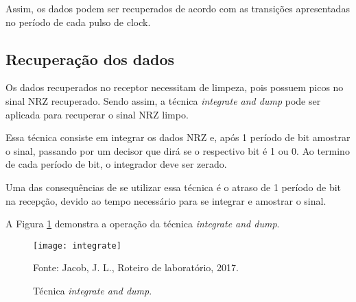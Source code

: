 	Assim, os dados podem ser recuperados de acordo com as transições apresentadas no período de cada pulso de clock.
	
\subsection{Recuperação dos dados}

	Os dados recuperados no receptor necessitam de limpeza, pois possuem picos no sinal NRZ recuperado. Sendo assim, a técnica \textit{integrate and dump} pode ser aplicada para recuperar o sinal NRZ limpo.
	
	Essa técnica consiste em integrar os dados NRZ e, após 1 período de bit amostrar o sinal, passando por um decisor que dirá se o respectivo bit é 1 ou 0. Ao termino de cada período de bit, o integrador deve ser zerado.
	
	Uma das consequências de se utilizar essa técnica é o atraso de 1 período de bit na recepção, devido ao tempo necessário para se integrar e amostrar o sinal.
	
	A Figura \ref{fig:integrate} demonstra a operação da técnica \textit{integrate and dump}.
	
		\begin{figure}[H]
			\centering
			\caption{Técnica \textit{integrate and dump}.}
			\texttt{[image: integrate]}
			
			\small Fonte: Jacob, J. L., Roteiro de laboratório, 2017.
			\label{fig:integrate}
		\end{figure}